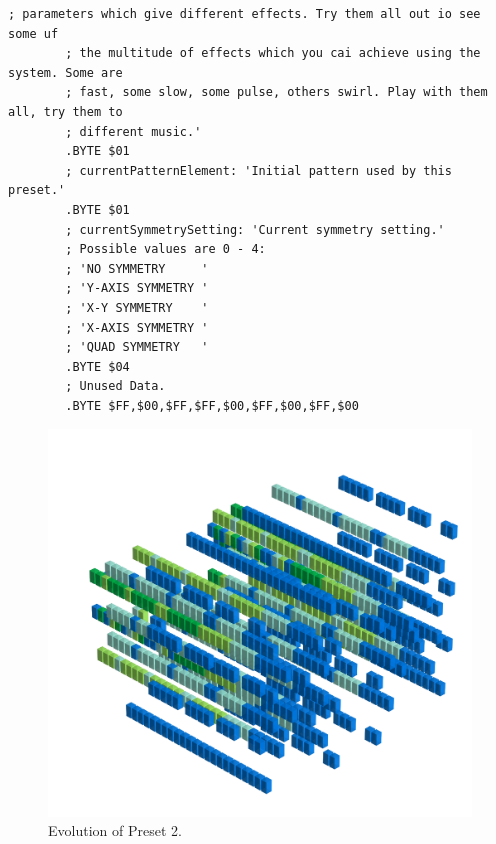 \begin{lstlisting}[basicstyle=\ttfamily\tiny,caption=Source code for Preset 1.]
        ; parameters which give different effects. Try them all out io see some uf
        ; the multitude of effects which you cai achieve using the system. Some are
        ; fast, some slow, some pulse, others swirl. Play with them all, try them to
        ; different music.'
        .BYTE $01
        ; currentPatternElement: 'Initial pattern used by this preset.'
        .BYTE $01
        ; currentSymmetrySetting: 'Current symmetry setting.'
        ; Possible values are 0 - 4:
        ; 'NO SYMMETRY     '
        ; 'Y-AXIS SYMMETRY '
        ; 'X-Y SYMMETRY    '
        ; 'X-AXIS SYMMETRY '
        ; 'QUAD SYMMETRY   '
        .BYTE $04
        ; Unused Data.
        .BYTE $FF,$00,$FF,$FF,$00,$FF,$00,$FF,$00
\end{lstlisting}


\clearpage                                                                 
\begin{figure}[H]                                                          
    \centering                                                             
    \begin{adjustbox}{width=14cm,center}                                   
      \includegraphics[width=14cm]{src/presets/pattern2-45.png}%
    \end{adjustbox}                                                        
\caption{Evolution of Preset 2.}                                           
\end{figure}                                                               
\clearpage                                                                 
                                                                           
